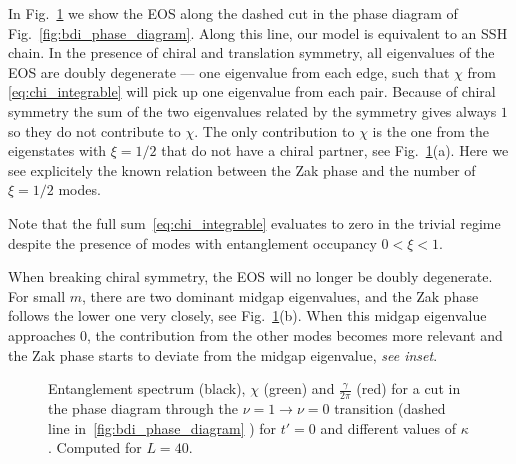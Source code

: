 \documentclass[twocolumn,amsmath,longbibliography,amssymb,superscriptaddress]{revtex4-1}
\newcommand{\carlos}[1]{{\color{red} #1}}
\newcommand{\mariac}[1]{{\it\color{cyan}#1}}
\begin{document}
In Fig.~\ref{huang} we show  the EOS along the dashed cut in the phase diagram of Fig.~\ref{fig:bdi_phase_diagram}. 
Along this line, our model is equivalent to an SSH chain. 
In the presence of chiral and translation symmetry, all eigenvalues of the EOS are doubly degenerate --- one eigenvalue from each edge, such that $\chi$ from \eqref{eq:chi_integrable} will pick up one eigenvalue from each pair. Because of chiral symmetry the sum of the two eigenvalues related by the symmetry gives always $1$ so they do not contribute to $\chi$. The only contribution to $\chi$ is the one from the eigenstates with $\xi=1/2$ that do not have a chiral partner, see Fig.~\ref{huang}(a). Here we see explicitely the known relation between the Zak phase and the number of $\xi = 1/2$ modes.

Note that the full sum~\eqref{eq:chi_integrable}  evaluates to zero in the trivial regime %
despite the presence of modes with entanglement occupancy $0<\xi<1$. 

When breaking chiral symmetry, the EOS will no longer be doubly degenerate. 
For small $m$, there are two dominant midgap eigenvalues, and the Zak phase follows the lower one very closely, see Fig.~\ref{huang}(b).
When this midgap eigenvalue approaches  0, the contribution from the other modes becomes more relevant and the Zak phase starts to deviate from the midgap eigenvalue, \mariac{see inset}.
\begin{figure}[t]
\centering
{}
\caption{Entanglement spectrum (black), $\chi$ (green) and $\frac{\gamma}{2\pi}$ (red) for a cut in the phase diagram through the $\nu = 1 \rightarrow \nu = 0$ transition (dashed line in~\ref{fig:bdi_phase_diagram}
	) for $t'=0$ and different values of $\kappa$. Computed for $L=40$.}
\label{huang}
\end{figure}
\end{document}
